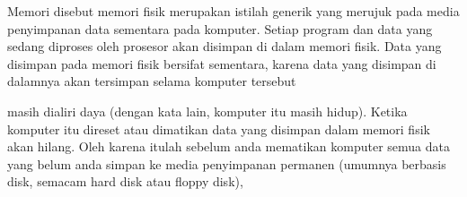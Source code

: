 
Memori disebut memori fisik merupakan istilah generik yang merujuk pada media penyimpanan data sementara pada komputer. Setiap program dan data yang sedang diproses oleh prosesor akan disimpan di dalam memori fisik. Data yang disimpan pada memori fisik bersifat sementara, karena data yang disimpan di dalamnya akan tersimpan selama komputer tersebut

masih dialiri daya (dengan kata lain, komputer itu masih hidup). Ketika komputer itu direset atau dimatikan data yang disimpan dalam memori fisik akan hilang. Oleh karena itulah sebelum anda mematikan komputer semua data yang belum anda simpan ke media penyimpanan permanen (umumnya berbasis disk, semacam hard disk atau floppy disk),